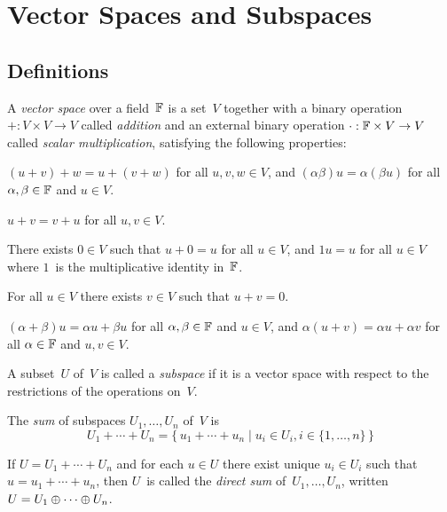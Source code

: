 %
%
%
\section{Vector Spaces and Subspaces}
\subsection*{Definitions}
\begin{defn}
A \emph{vector space} over a field~\(\mathbb{F}\) is a set~\(V\) together with a binary operation \(+:V\times V\to V\) called \emph{addition} and an external binary operation \(\cdot:\mathbb{F}\times V\to V\) called \emph{scalar multiplication}, satisfying the following properties:
\begin{description}[itemsep=0pt]
\item[Associativity] \((u+v)+w=u+(v+w)\) for all \(u,v,w\in V\), and \((\alpha\beta)u=\alpha(\beta u)\) for all \(\alpha,\beta\in\mathbb{F}\) and \(u\in V\).
\item[Commutativity] \(u+v=v+u\) for all \(u,v\in V\).
\item[Identities] There exists \(0\in V\) such that \(u+0=u\) for all \(u\in V\), and \(1u=u\) for all \(u\in V\) where \(1\)~is the multiplicative identity in~\(\mathbb{F}\).
\item[Inverses] For all \(u\in V\) there exists \(v\in V\) such that \(u+v=0\).
\item[Distributivity] \((\alpha+\beta)u=\alpha u+\beta u\) for all \(\alpha,\beta\in\mathbb{F}\) and \(u\in V\), and \(\alpha(u+v)=\alpha u+\alpha v\) for all \(\alpha\in\mathbb{F}\) and \(u,v\in V\).
\end{description}
\end{defn}

\begin{defn}
A subset~\(U\) of~\(V\) is called a \emph{subspace} if it is a vector space with respect to the restrictions of the operations on~\(V\).
\end{defn}

\begin{defn}
The \emph{sum} of subspaces \(U_1,\ldots,U_n\) of~\(V\) is
\[U_1+\cdots+U_n=\{\,u_1+\cdots+u_n\mid u_i\in U_i, i\in\{1,\ldots,n\}\,\}\]
\end{defn}

\begin{defn}
If \(U=U_1+\cdots+U_n\) and for each \(u\in U\) there exist unique \(u_i\in U_i\) such that \(u=u_1+\cdots+u_n\), then \(U\)~is called the \emph{direct sum} of~\(U_1,\ldots,U_n\), written \(U=U_1\oplus\cdots\oplus U_n\).
\end{defn}

